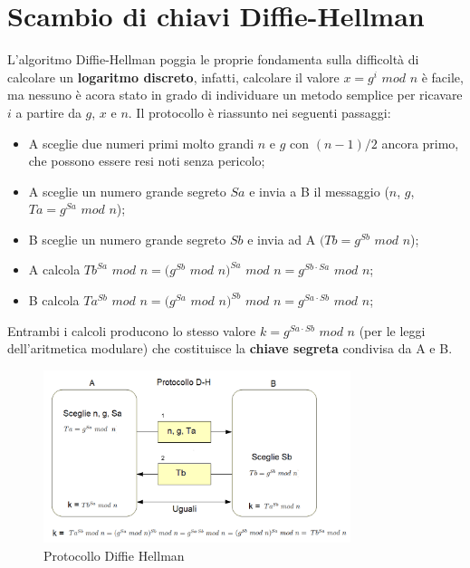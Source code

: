 \section{Scambio di chiavi Diffie-Hellman}
L'algoritmo Diffie-Hellman \cite{dh} poggia le proprie fondamenta sulla difficoltà di calcolare un \textbf{logaritmo discreto}, infatti, calcolare il valore $x = g^i$ $mod$ $n$ è facile, ma nessuno è acora stato in grado di individuare un metodo semplice per ricavare $i$ a partire da $g$, $x$ e $n$. Il protocollo è riassunto nei seguenti passaggi:
\begin{itemize}
    \item A sceglie due numeri primi molto grandi $n$ e $g$ con $(n-1)/2$ ancora primo, che possono essere resi noti senza pericolo;
    \item A sceglie un numero grande segreto $Sa$ e invia a B il messaggio ($n$, $g$, $Ta = g^{Sa}$ $mod$ $n$);
    \item B sceglie un numero grande segreto $Sb$ e invia ad A $(Tb = g^{Sb}$ $mod$ $n$);
    \item A calcola $Tb^{Sa}$ $mod$ $n = (g^{Sb}$ $mod$ $n)^{Sa}$ $mod$ $n = g^{Sb \cdot Sa}$ $mod$ $n$;
    \item B calcola $Ta^{Sb}$ $mod$ $n = (g^{Sa}$ $mod$ $n)^{Sb}$ $mod$ $n = g^{Sa \cdot Sb}$ $mod$ $n$;
\end{itemize}
Entrambi i calcoli producono lo stesso valore $ k = g^{Sa \cdot Sb}$ $mod$ $n$ (per le leggi dell’aritmetica modulare) che costituisce la \textbf{chiave segreta} condivisa da A e B.
\begin{figure}[H]
    \centering
    \includegraphics[width=0.8\textwidth]{MainContent/img/cap3/DH.png}
    \caption{Protocollo Diffie Hellman}
    \label{fig:DH}
\end{figure}
